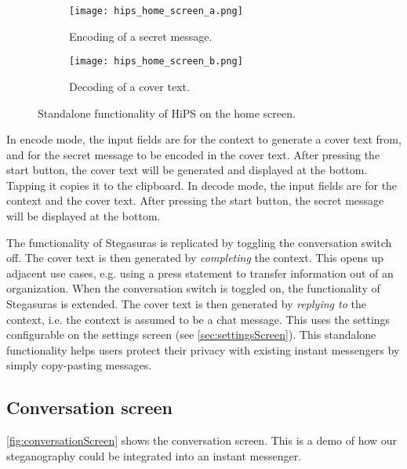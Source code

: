 \begin{figure}
	\begin{wide}
		\captionsetup{width=\linewidth}
		\begin{subfigure}{0.45\linewidth}
			\centering
			\texttt{[image: hips\_home\_screen\_a.png]}
			\caption{Encoding of a secret message.}
			\label{fig:homeScreenA}
		\end{subfigure}
        \hfill
		\begin{subfigure}{0.45\linewidth}
			\centering
			\texttt{[image: hips\_home\_screen\_b.png]}
			\caption{Decoding of a cover text.}
			\label{fig:homeScreenB}
		\end{subfigure}
		\caption[HiPS: Home screen]{Standalone functionality of HiPS on the home screen.}
		\label{fig:homeScreen}
	\end{wide}
\end{figure}

In encode mode, the input fields are for the context to generate a cover text from, and for the secret message to be encoded in the cover text. After pressing the start button, the cover text will be generated and displayed at the bottom. Tapping it copies it to the clipboard. In decode mode, the input fields are for the context and the cover text. After pressing the start button, the secret message will be displayed at the bottom.

The functionality of Stegasuras is replicated by toggling the conversation switch off. The cover text is then generated by \textit{completing} the context. This opens up adjacent use cases, e.g. using a press statement to transfer information out of an organization. When the conversation switch is toggled on, the functionality of Stegasuras is extended. The cover text is then generated by \textit{replying to} the context, i.e. the context is assumed to be a chat message. This uses the settings configurable on the settings screen (see \cref{sec:settingsScreen}). This standalone functionality helps users protect their privacy with existing instant messengers by simply copy-pasting messages.

\subsection{Conversation screen}
\label{sec:conversationScreen}
\cref{fig:conversationScreen} shows the conversation screen. This is a demo of how our steganography could be integrated into an instant messenger.

